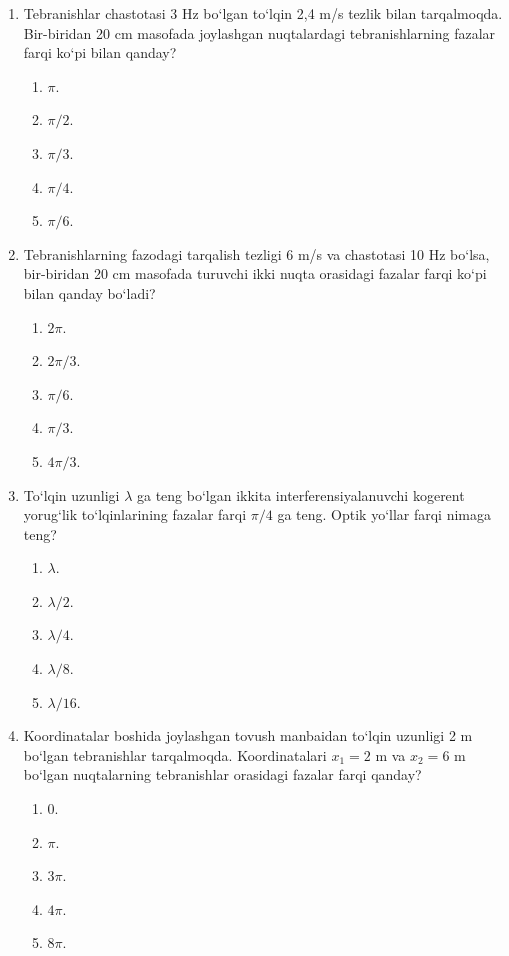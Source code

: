 \begin{enumerate}
\item Tebranishlar chastotasi 3 Hz bo‘lgan to‘lqin 2,4 m/s tezlik bilan tarqalmoqda. Bir-biridan 20 cm masofada joylashgan nuqtalardagi tebranishlarning fazalar farqi ko‘pi bilan qanday?
\begin{enumerate}[label=\Alph*)]
\item $\pi$.
\item $\pi/2$.
\item $\pi/3$.
\item $\pi/4$.
\item $\pi/6$.
\end{enumerate}

\item Tebranishlarning fazodagi tarqalish tezligi 6 m/s va chastotasi 10 Hz bo‘lsa, bir-biridan 20 cm masofada turuvchi ikki nuqta orasidagi fazalar farqi ko‘pi bilan qanday bo‘ladi?
\begin{enumerate}[label=\Alph*)]
\item $2\pi$.
\item $2\pi/3$.
\item $\pi/6$.
\item $\pi/3$.
\item $4\pi/3$.
\end{enumerate}

\item To‘lqin uzunligi $\lambda$ ga teng bo‘lgan ikkita interferensiyalanuvchi kogerent yorug‘lik to‘lqinlarining fazalar farqi $\pi/4$ ga teng. Optik yo‘llar farqi nimaga teng?
\begin{enumerate}[label=\Alph*)]
\item $\lambda$.
\item $\lambda/2$.
\item $\lambda/4$.
\item $\lambda/8$.
\item $\lambda/16$.
\end{enumerate}

\item Koordinatalar boshida joylashgan tovush manbaidan to‘lqin uzunligi 2 m bo‘lgan tebranishlar tarqalmoqda. Koordinatalari $x_1=2$ m va $x_2=6$ m bo‘lgan nuqtalarning tebranishlar orasidagi fazalar farqi qanday?
\begin{enumerate}[label=\Alph*)]
\item 0.
\item $\pi$.
\item $3\pi$.
\item $4\pi$.
\item $8\pi$.
\end{enumerate}


\end{enumerate}

